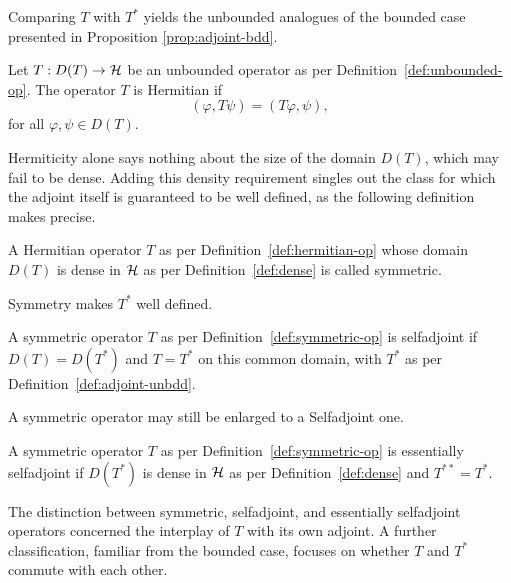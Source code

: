 \noindent Comparing $T$ with $T^{*}$ yields the unbounded analogues of the bounded case presented in Proposition \ref{prop:adjoint-bdd}.

\begin{definition}\label{def:hermitian-op}
	Let $T: D(T)\to\H$ be an unbounded operator as per Definition~\ref{def:unbounded-op}. The operator $T$ is Hermitian if
	\begin{equation}
		(\varphi,T\psi)=( T\varphi,\psi),
	\end{equation}
	for all $\varphi,\psi\in D(T)$.
\end{definition}

Hermiticity alone says nothing about the size of the domain $D(T)$, which may fail to be dense. Adding this density requirement singles out the class for which the adjoint itself is guaranteed to be well defined, as the following definition makes precise.

\begin{definition}\label{def:symmetric-op}
	A Hermitian operator $T$ as per Definition~\ref{def:hermitian-op} whose domain $D(T)$ is dense in $\H$ as per Definition~\ref{def:dense} is called symmetric.
\end{definition}

\noindent Symmetry makes $T^{*}$ well defined.

\begin{definition}\label{def:selfadjoint-unbdd}
	A symmetric operator $T$ as per Definition~\ref{def:symmetric-op} is selfadjoint if $D(T)=D(T^{*})$ and $T=T^{*}$ on this common domain, with $T^{*}$ as per Definition~\ref{def:adjoint-unbdd}.
\end{definition}

\noindent A symmetric operator may still be enlarged to a Selfadjoint one.

\begin{definition}\label{def:ess-selfadjoint}
	A symmetric operator $T$ as per Definition~\ref{def:symmetric-op} is essentially selfadjoint if $D(T^{*})$ is dense in $\H$ as per Definition~\ref{def:dense} and $T^{**}=T^{*}$.
\end{definition}

The distinction between symmetric, selfadjoint, and essentially selfadjoint operators concerned the interplay of $T$ with its own adjoint. A further classification, familiar from the bounded case, focuses on whether $T$ and $T^*$ commute with each other.

